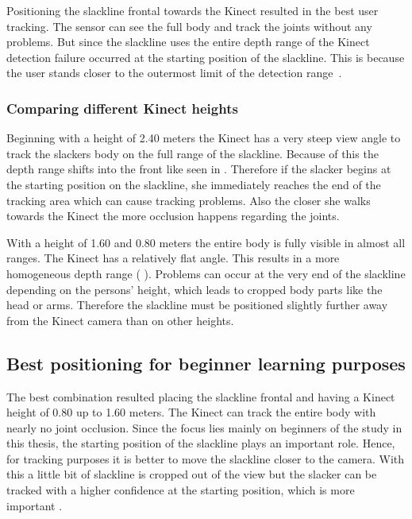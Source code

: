 Positioning the slackline frontal towards the Kinect resulted in the best user tracking.
The sensor can see the full body and track the joints without any problems.
But since the slackline uses the entire depth range of the Kinect detection failure occurred at the starting position of the slackline. This is because the user stands closer to the outermost limit of the detection range~\textbf{}.

\subsubsection{Comparing different Kinect heights}

Beginning with a height of 2.40 meters the Kinect has a very steep view angle to track the slackers body on the full range of the slackline. Because of this the depth range shifts into the front like seen in \textbf{}. Therefore if the slacker begins at the starting position on the slackline, she immediately reaches the end of the tracking area which can cause tracking problems. Also the closer she walks towards the Kinect the more occlusion happens regarding the joints.

With a height of 1.60 and 0.80 meters the entire body is fully visible in almost all ranges. The Kinect has a relatively flat angle. This results in a more homogeneous depth range ( \textbf{}). Problems can occur at the very end of the slackline depending on the persons' height, which leads to cropped body parts like the head or arms. Therefore the slackline must be positioned slightly further away from the Kinect camera than on other heights.


\subsection{Best positioning for beginner learning purposes}
The best combination resulted placing the slackline frontal and having a Kinect height of 0.80 up to 1.60 meters. The Kinect can track the entire body with nearly no joint occlusion. Since the focus lies mainly on beginners of the study in this thesis, the starting position of the slackline plays an important role. Hence, for tracking purposes it is better to move the slackline closer to the camera. With this a little bit of slackline is cropped out of the view but the slacker can be tracked with a higher confidence at the starting position, which is more important \textbf{}.
